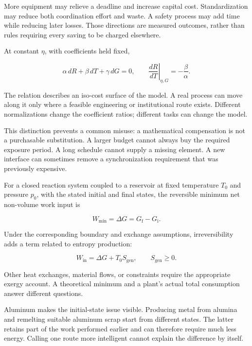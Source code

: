 More equipment may relieve a deadline and increase capital cost. Standardization may reduce both coordination effort and waste. A safety process may add time while reducing later losses. Those directions are measured outcomes, rather than rules requiring every saving to be charged elsewhere.


At constant $\eta$, with coefficients held fixed,

\begin{equation}
\alpha\,dR+\beta\,dT+\gamma\,dG=0,
\qquad
\left.\frac{dR}{dT}\right|_{\eta,G}=-\frac{\beta}{\alpha}.
\end{equation}

The relation describes an iso-cost surface of the model. A real process can move along it only where a feasible engineering or institutional route exists. Different normalizations change the coefficient ratios; different tasks can change the model.

This distinction prevents a common misuse: a mathematical compensation is not a purchasable substitution. A larger budget cannot always buy the required exposure period. A long schedule cannot supply a missing element. A new interface can sometimes remove a synchronization requirement that was previously expensive.


For a closed reaction system coupled to a reservoir at fixed temperature $T_0$ and pressure $p_0$, with the stated initial and final states, the reversible minimum net non-volume work input is

\begin{equation}
W_{\min}=\Delta G=G_{\mathrm f}-G_{\mathrm i}.
\end{equation}

Under the corresponding boundary and exchange assumptions, irreversibility adds a term related to entropy production:

\begin{equation}
W_{\mathrm{in}}=\Delta G+T_0S_{\mathrm{gen}},
\qquad S_{\mathrm{gen}}\geq0.
\end{equation}

Other heat exchanges, material flows, or constraints require the appropriate exergy account. A theoretical minimum and a plant's actual total consumption answer different questions.

Aluminum makes the initial-state issue visible. Producing metal from alumina and remelting suitable aluminum scrap start from different states. The latter retains part of the work performed earlier and can therefore require much less energy.\cite{quinkertz2001scenario} Calling one route more intelligent cannot explain the difference by itself.

